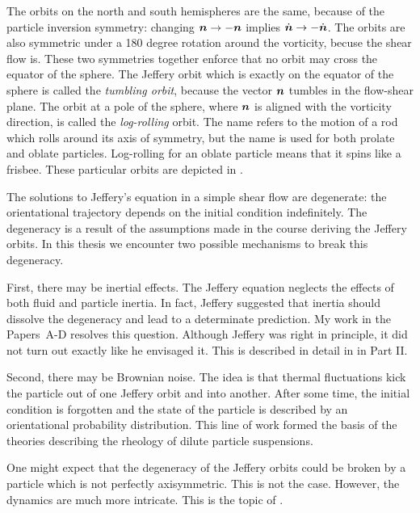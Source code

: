 \documentclass[thesis.tex]{subfiles}
\begin{document}
The orbits on the north and south hemispheres are the same, because of the particle inversion symmetry: changing $\mbox{\boldmath$n$} \to -\mbox{\boldmath$n$}$ implies $\dot{\mbox{\boldmath$n$}} \to - \dot{\mbox{\boldmath$n$}}$. The orbits are also symmetric under a 180 degree rotation around the vorticity, becuse the shear flow is. These two symmetries together enforce that no orbit may cross the equator of the sphere. The Jeffery orbit which is exactly on the equator of the sphere is called the \emph{tumbling orbit}, because the vector $\mbox{\boldmath$n$}$ tumbles in the flow-shear plane. The orbit at a pole of the sphere, where $\mbox{\boldmath$n$}$ is aligned with the vorticity direction, is called the \emph{log-rolling} orbit. The name refers to the motion of a rod which rolls around its axis of symmetry, but the name is used for both prolate and oblate particles. Log-rolling for an oblate particle means that it spins like a frisbee. These particular orbits are depicted in .

The solutions to Jeffery's equation in a simple shear flow are degenerate: the orientational trajectory depends on the initial condition indefinitely. The degeneracy is a result of the assumptions made in the course deriving the Jeffery orbits. In this thesis we encounter two possible mechanisms to break this degeneracy.

First, there may be inertial effects. The Jeffery equation neglects the effects of both fluid and particle inertia. In fact, Jeffery suggested that inertia should dissolve the degeneracy and lead to a determinate prediction. My work in the Papers~A-D resolves this question. Although Jeffery was right in principle, it did not turn out exactly like he envisaged it. This is described in detail in  in Part II.

Second, there may be Brownian noise. The idea is that thermal fluctuations kick the particle out of one Jeffery orbit and into another. After some time, the initial condition is forgotten and the state of the particle is described by an orientational probability distribution. This line of work formed the basis of the theories describing the rheology of dilute particle suspensions.

One might expect that the degeneracy of the Jeffery orbits could be broken by a particle which is not perfectly axisymmetric. This is not the case. However, the dynamics are much more intricate. This is the topic of .
\end{document}
